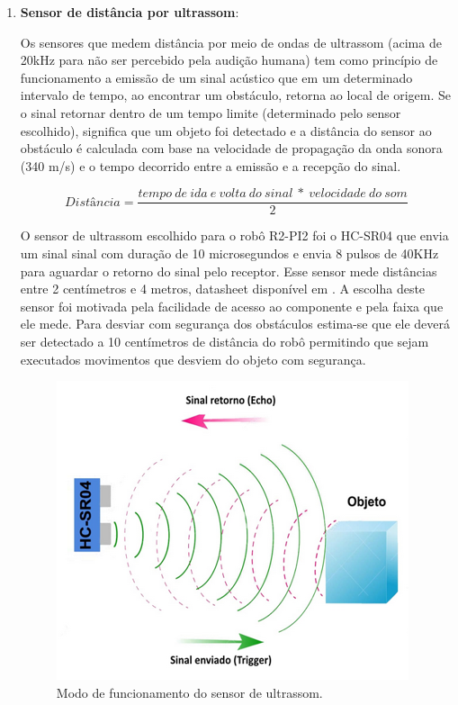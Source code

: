   \begin{enumerate}
  	\item \textbf{Sensor de distância por ultrassom}:

  		Os sensores que medem distância por meio de ondas de ultrassom (acima de 20kHz para não ser percebido pela audição humana) tem como princípio de funcionamento a emissão de um sinal acústico que em um determinado intervalo de tempo, ao encontrar um obstáculo, retorna ao local de origem. Se o sinal retornar dentro de um tempo limite (determinado pelo sensor escolhido), significa que um objeto foi detectado e a distância do sensor ao obstáculo é calculada com base na velocidade de propagação da onda sonora (340 m/s) e o tempo decorrido entre a emissão e a recepção do sinal.
  		
  		\begin{equation}
  		\label{eq:equação_ultrassom}
  			Distância = \frac{tempo\ de\ ida\ e\ volta\ do\ sinal\ *\ velocidade\ do\ som}{2}
  		\end{equation}

  		O sensor de ultrassom escolhido para o robô R2-PI2 foi o HC-SR04 que envia um sinal sinal com duração de 10 microsegundos e envia 8 pulsos de 40KHz para aguardar o retorno do sinal pelo receptor. Esse sensor mede distâncias entre 2 centímetros e 4 metros, datasheet disponível em \cite{datasheet_ultrassom}. A escolha deste sensor foi motivada pela facilidade de acesso ao componente e pela faixa que ele mede. Para desviar com segurança dos obstáculos estima-se que ele deverá ser detectado a 10 centímetros de distância do robô permitindo que sejam executados movimentos que desviem do objeto com segurança.

  		\begin{figure}[H]                                                           
      		\centering                                                                
      		\includegraphics[scale=0.7]{figuras/Ultrassom_principio.png}               
      		\caption{Modo de funcionamento do sensor de ultrassom.}    
      		\label{img:funcionamento_utrassom}                                            
    	\end{figure} 


\end{enumerate}
